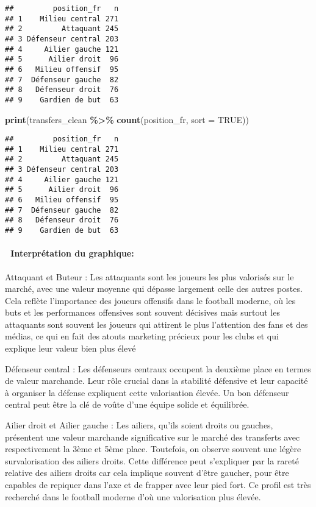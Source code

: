 \documentclass[
]{article}
\newenvironment{Shaded}{\begin{snugshade}}{\end{snugshade}}
\newcommand{\AttributeTok}[1]{\textcolor[rgb]{0.13,0.29,0.53}{#1}}
\newcommand{\ConstantTok}[1]{\textcolor[rgb]{0.56,0.35,0.01}{#1}}
\newcommand{\FunctionTok}[1]{\textcolor[rgb]{0.13,0.29,0.53}{\textbf{#1}}}
\newcommand{\NormalTok}[1]{#1}
\newcommand{\SpecialCharTok}[1]{\textcolor[rgb]{0.81,0.36,0.00}{\textbf{#1}}}
\begin{document}
\begin{verbatim}
##         position_fr   n
## 1    Milieu central 271
## 2         Attaquant 245
## 3 Défenseur central 203
## 4     Ailier gauche 121
## 5      Ailier droit  96
## 6   Milieu offensif  95
## 7  Défenseur gauche  82
## 8   Défenseur droit  76
## 9    Gardien de but  63
\end{verbatim}

\begin{Shaded}
\begin{Highlighting}[]
\FunctionTok{print}\NormalTok{(transfers\_clean }\SpecialCharTok{\%\textgreater{}\%} \FunctionTok{count}\NormalTok{(position\_fr, }\AttributeTok{sort =} \ConstantTok{TRUE}\NormalTok{))}
\end{Highlighting}
\end{Shaded}

\begin{verbatim}
##         position_fr   n
## 1    Milieu central 271
## 2         Attaquant 245
## 3 Défenseur central 203
## 4     Ailier gauche 121
## 5      Ailier droit  96
## 6   Milieu offensif  95
## 7  Défenseur gauche  82
## 8   Défenseur droit  76
## 9    Gardien de but  63
\end{verbatim}

\paragraph{🧠 Interprétation du
graphique:}\label{interpruxe9tation-du-graphique-1}

Attaquant et Buteur : Les attaquants sont les joueurs les plus valorisés
sur le marché, avec une valeur moyenne qui dépasse largement celle des
autres postes. Cela reflète l'importance des joueurs offensifs dans le
football moderne, où les buts et les performances offensives sont
souvent décisives mais surtout les attaquants sont souvent les joueurs
qui attirent le plus l'attention des fans et des médias, ce qui en fait
des atouts marketing précieux pour les clubs et qui explique leur valeur
bien plus élevé

Défenseur central : Les défenseurs centraux occupent la deuxième place
en termes de valeur marchande. Leur rôle crucial dans la stabilité
défensive et leur capacité à organiser la défense expliquent cette
valorisation élevée. Un bon défenseur central peut être la clé de voûte
d'une équipe solide et équilibrée.

Ailier droit et Ailier gauche : Les ailiers, qu'ils soient droits ou
gauches, présentent une valeur marchande significative sur le marché des
transferts avec respectivement la 3ème et 5ème place. Toutefois, on
observe souvent une légère survalorisation des ailiers droits. Cette
différence peut s'expliquer par la rareté relative des ailiers droits
car cela implique souvent d'être gaucher, pour être capables de repiquer
dans l'axe et de frapper avec leur pied fort. Ce profil est très
recherché dans le football moderne d'où une valorisation plus élevée.
\end{document}
